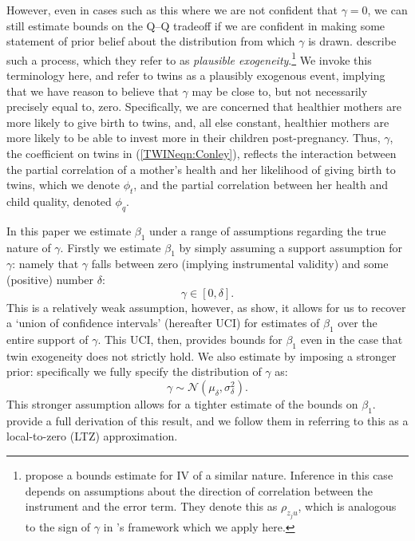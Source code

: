 \documentclass[subeqn]{article}
\begin{document}
\begin{spacing}{1.4}
However, even in cases such as this where we are not confident that $\gamma=0$,
we can still estimate bounds on the Q--Q tradeoff if we are confident in making
some statement of prior belief about the distribution from which $\gamma$ is 
drawn.  \citet{Conleyetal2012} describe such a process, which they refer to as 
\emph{plausible exogeneity}.\footnote{\citet{NevoRosen2012} propose a bounds
estimate for IV of a similar nature.  Inference in this case depends on 
assumptions about the direction of correlation between the instrument and the 
error term. They denote this as $\rho_{z_{j}u}$, which is analogous to the sign 
of $\gamma$ in \citeauthor{Conleyetal2012}'s framework which we apply here.} We 
invoke this terminology here, and refer to twins as a plausibly exogenous event, 
implying that we have reason to believe that $\gamma$ may be close to, but not 
necessarily precisely equal to, zero. Specifically, we are concerned that 
healthier mothers are more likely to give birth to twins, and, all else 
constant, healthier mothers are more likely to be able to invest more in their 
children post-pregnancy.  Thus, $\gamma$, the coefficient on twins in 
(\ref{TWINeqn:Conley}), reflects the interaction between the partial correlation 
of a mother's health and her likelihood of giving birth to twins, which we 
denote $\phi_t$, and the partial correlation between her health and child 
quality, denoted $\phi_q$.

In this paper we estimate $\beta_1$ under a range of assumptions regarding the
true nature of $\gamma$.  Firstly we estimate $\beta_1$ by simply assuming a
support assumption for $\gamma$: namely that $\gamma$ falls between zero 
(implying instrumental validity) and some (positive) number $\delta$:
\begin{equation}
\label{TWINeqn:uci}
\gamma \in [0,\delta].
\end{equation}
This is a relatively weak assumption, however, as \citet{Conleyetal2012} show,
it allows for us to recover a `union of confidence intervals' (hereafter UCI) 
for estimates of $\beta_1$ over the entire support of $\gamma$.  This UCI, then, 
provides bounds for $\beta_1$ even in the case that twin exogeneity does not 
strictly hold. We also estimate by imposing a stronger prior: specifically we 
fully specify the distribution of $\gamma$ as:
\begin{equation}
\label{TWINeqn:ltz}
\gamma \sim \mathcal{N}(\mu_\delta,\sigma^2_\delta).
\end{equation}
This stronger assumption allows for a tighter estimate of the bounds on 
$\beta_1$.  \citet{Conleyetal2012} provide a full derivation of this result, and 
we follow them in referring to this as a local-to-zero (LTZ) approximation.


\end{spacing}
\end{document}
